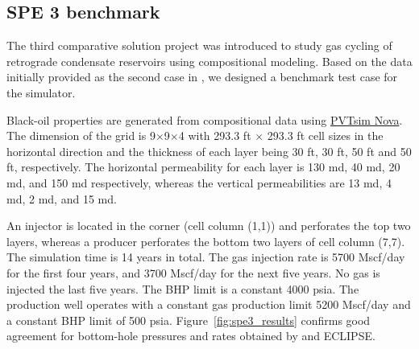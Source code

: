 
\subsection{SPE 3 benchmark}
\label{sec:spe3}

The third comparative solution project \citep{kenyon1987third} was introduced to study
gas cycling of retrograde condensate reservoirs using compositional modeling.  Based on
the data initially provided as the second case in
\cite{kenyon1987third}, we designed a benchmark test case for the \opmflow
simulator.

Black-oil properties are generated from compositional data using
\href{http://www.pvtsimnova}{PVTsim Nova}. The dimension of the grid is
9$\times$9$\times$4 with 293.3 ft $\times$ 293.3 ft cell sizes in the horizontal direction
and the thickness of each layer being 30 ft, 30 ft, 50 ft and 50 ft, respectively. The
horizontal permeability for each layer is 130 md, 40 md, 20 md, and 150 md
respectively, whereas the vertical permeabilities are 13 md, 4 md, 2 md, and 15 md.

An injector is located in the corner (cell column (1,1)) and perforates the top two
layers, whereas a producer perforates the bottom two layers of cell column (7,7). The
simulation time is 14 years in total.  The gas injection rate is 5700 Mscf/day for the
first four years, and 3700 Mscf/day for the next five years. No gas is injected the last
five years.  The BHP limit is a constant 4000 psia.  The production well operates with a
constant gas production limit 5200 Mscf/day and a constant BHP limit of 500 psia.
Figure~\ref{fig:spe3_results} confirms good agreement for bottom-hole pressures and rates
obtained by \opmflow and ECLIPSE.

